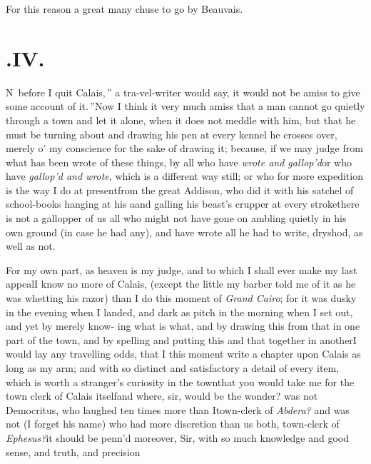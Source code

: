 \documentclass{article}
\begin{document}
For this reason a great many chuse to go by Beauvais.

\section{.\enspace IV.}

\lettrine{\lower-10pt\hbox{\normalsize\large\lqq}N}{\,} before I quit
Calais,\,” a tra-\break vel-writer would say, \lqq it would\break
\lqq not be amiss to give some account of\break
\lqq it.\,”\tsk Now I think it very much amiss\break
\tsk that a man
cannot go quietly through a town and let it alone, when it does not meddle with him,
but that he must be turning about and drawing his pen at every kennel he crosses
over, merely o’ my conscience for the sake of drawing it; because, if we may judge
from what has been wrote of these things, by all who have \textit{wrote and
gallop’d}\tsk or who have \textit{gallop’d and wrote}, which is a different way still;
or who for more expedition
 is
the way I do at present\tsk from the great Addison, who did it with his
satchel of school-books hanging at his a\tsk and galling his beast’s crupper at
every stroke\break\tsk there is not a gallopper of us all who might not have gone on ambling
quietly in his own ground (in case he had any), and have wrote all he had to write,
dry\break shod, as well as not.

For my own part, as heaven is my judge, and to which I shall ever make my last
appeal\tsk I know no more of Calais, (except the little my barber told me of it as he
was whetting his razor) than I do this moment of \textit{Grand Cairo}; for it was
dusky in the evening when I landed, and dark as pitch in the morning when I set out,
and yet by merely know-
ing what is what, and by drawing this from that in one part of
the town, and by spelling and putting this and that together in another\tsk I would
lay any travelling odds, that I this moment write a chapter upon Calais as
long as my arm; and with so distinct and satisfactory a detail of every item, which
is worth a stranger’s curiosity in the town\tsk that you would take me for the
town clerk of Calais itself\tsk and where, sir, would be the wonder? was not
Democritus, who laughed ten times more than I\tsk town-clerk of
\textit{Abdera?} and was not (I forget his name) who had more discretion than us
both, town-clerk of \textit{Ephesus?}\tsh it should be penn’d moreover, Sir, with so
much knowledge and good sense, and truth, and precision\tsh{}
\end{document}
